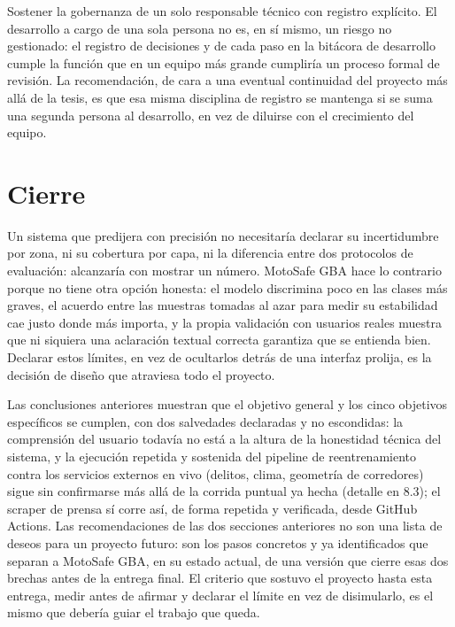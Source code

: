 Sostener la gobernanza de un solo responsable técnico con registro
explícito. El desarrollo a cargo de una sola persona no es, en sí mismo,
un riesgo no gestionado: el registro de decisiones y de cada paso en la
bitácora de desarrollo cumple la función que en un equipo más grande
cumpliría un proceso formal de revisión. La recomendación, de cara a una
eventual continuidad del proyecto más allá de la tesis, es que esa misma
disciplina de registro se mantenga si se suma una segunda persona al
desarrollo, en vez de diluirse con el crecimiento del equipo.

\section{Cierre}

Un sistema que predijera con precisión no necesitaría declarar su
incertidumbre por zona, ni su cobertura por capa, ni la diferencia entre
dos protocolos de evaluación: alcanzaría con mostrar un número. MotoSafe
GBA hace lo contrario porque no tiene otra opción honesta: el modelo
discrimina poco en las clases más graves, el acuerdo entre las muestras
tomadas al azar para medir su estabilidad cae justo donde más importa, y
la propia validación con usuarios reales muestra que ni siquiera una
aclaración textual correcta garantiza que se entienda bien. Declarar
estos límites, en vez de ocultarlos detrás de una interfaz prolija, es
la decisión de diseño que atraviesa todo el proyecto.

Las conclusiones anteriores muestran que el objetivo general y los cinco
objetivos específicos se cumplen, con dos salvedades declaradas y no
escondidas: la comprensión del usuario todavía no está a la altura de la
honestidad técnica del sistema, y la ejecución repetida y sostenida del
pipeline de reentrenamiento contra los servicios externos en vivo
(delitos, clima, geometría de corredores) sigue sin confirmarse más allá
de la corrida puntual ya hecha (detalle en 8.3); el scraper de prensa sí
corre así, de forma repetida y verificada, desde GitHub Actions. Las
recomendaciones de las dos secciones anteriores no son una lista de
deseos para un proyecto futuro: son los pasos concretos y ya
identificados que separan a MotoSafe GBA, en su estado actual, de una
versión que cierre esas dos brechas antes de la entrega final. El
criterio que sostuvo el proyecto hasta esta entrega, medir antes de
afirmar y declarar el límite en vez de disimularlo, es el mismo que
debería guiar el trabajo que queda.
